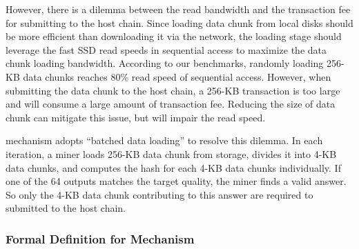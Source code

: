 However, there is a dilemma between the read bandwidth and the transaction fee for submitting {\sproof} to the host chain.
%
Since loading data chunk from local disks should be more efficient than downloading it via the network,
%
the loading stage should leverage the fast SSD read speeds in sequential access to maximize the data chunk loading bandwidth.
%
According to our benchmarks, randomly loading 256-KB data chunks reaches 80\% read speed of sequential access. 
%
However, when submitting the data chunk to the host chain, a 256-KB transaction is too large and will consume a large amount of transaction fee.
%
Reducing the size of data chunk can mitigate this issue, but will impair the read speed. 

{\sproof} mechanism adopts ``batched data loading'' to resolve this dilemma. 
%
In each iteration, a miner loads 256-KB data chunk from storage, divides it into 4-KB data chunks, and computes the hash for each 4-KB data chunks individually. 
%
If one of the 64 outputs matches the target quality, the miner finds a valid answer.
%
So only the 4-KB data chunk contributing to this answer are required to submitted to the host chain. 

\subsubsection{Formal Definition for \sproof Mechanism}


